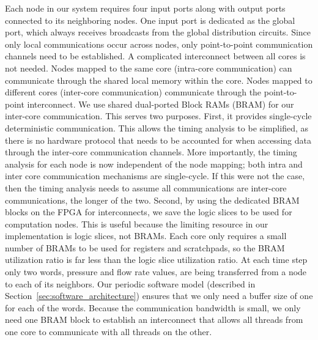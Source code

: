  
Each node in our system requires four input ports along with output ports connected to its neighboring nodes.  
One input port is dedicated as the global port, which always receives broadcasts from the global distribution circuits.
Since only local communications occur across nodes, only point-to-point communication channels need to be established. 
A complicated interconnect between all cores is not needed. 
Nodes mapped to the same core (intra-core communication) can communicate through the shared local memory within the core.
Nodes mapped to different cores (inter-core communication) communicate through the point-to-point interconnect.  
We use shared dual-ported Block RAMs (BRAM) for our inter-core communication.
This serves two purposes. 
First, it provides single-cycle deterministic communication.
This allows the timing analysis to be simplified, as there is no hardware protocol that needs to be accounted for when accessing data through the inter-core communication channels. 
More importantly, the timing analysis for each node is now independent of the node mapping; both intra and inter core communication mechanisms are single-cycle. 
If this were not the case, then the timing analysis needs to assume all communications are inter-core communications, the longer of the two. 
Second, by using the dedicated BRAM blocks on the FPGA for interconnects, we save the logic slices to be used for computation nodes.
This is useful because the limiting resource in our implementation is logic slices, not BRAMs. 
Each core only requires a small number of BRAMs to be used for registers and scratchpads, so the BRAM utilization ratio is far less than the logic slice utilization ratio.
At each time step only two words, pressure and flow rate values, are being transferred from a node to each of its neighbors. 
Our periodic software model (described in Section~\ref{sec:software_architecture}) ensures that we only need a buffer size of one for each of the words. 
Because the communication bandwidth is small, we only need one BRAM block to establish an interconnect that allows all threads from one core to communicate with all threads on the other.

